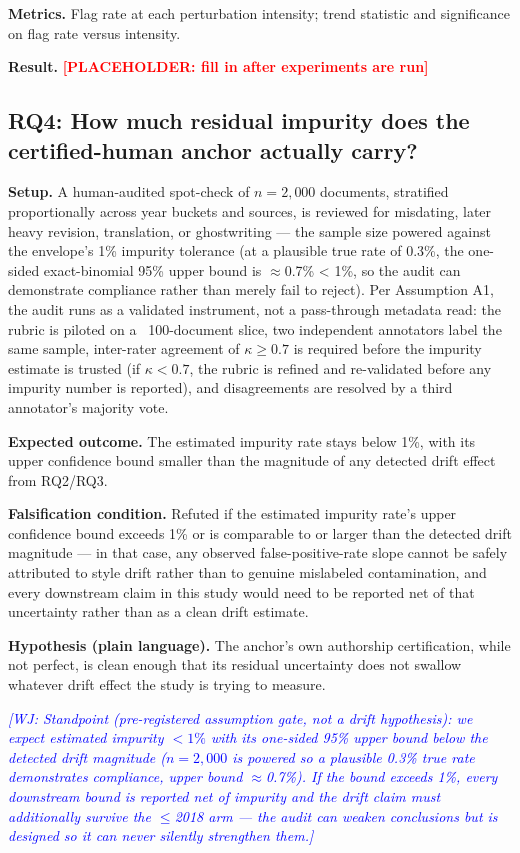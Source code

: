 \documentclass[conference]{IEEEtran}
\newcommand{\placeholder}[1]{\textcolor{red}{\textbf{[PLACEHOLDER: #1]}}}
\newcommand{\wj}[1]{\textcolor{blue}{\emph{[WJ: #1]}}}
\begin{document}
\textbf{Metrics.} Flag rate at each perturbation intensity; trend statistic and significance on flag rate versus intensity.

\textbf{Result.} \placeholder{fill in after experiments are run}

\subsection{RQ4: How much residual impurity does the certified-human anchor actually carry?}

 \textbf{Setup.} A human-audited spot-check of $n=2{,}000$ documents, stratified proportionally across year buckets and sources, is reviewed for misdating, later heavy revision, translation, or ghostwriting --- the sample size powered against the envelope's 1\% impurity tolerance (at a plausible true rate of 0.3\%, the one-sided exact-binomial 95\% upper bound is $\approx$0.7\% < 1\%, so the audit can demonstrate compliance rather than merely fail to reject). Per Assumption A1, the audit runs as a validated instrument, not a pass-through metadata read: the rubric is piloted on a ~100-document slice, two independent annotators label the same sample, inter-rater agreement of $\kappa \geq 0.7$ is required before the impurity estimate is trusted (if $\kappa < 0.7$, the rubric is refined and re-validated before any impurity number is reported), and disagreements are resolved by a third annotator's majority vote.

\textbf{Expected outcome.} The estimated impurity rate stays below 1\%, with its upper confidence bound smaller than the magnitude of any detected drift effect from RQ2/RQ3.

\textbf{Falsification condition.} Refuted if the estimated impurity rate's upper confidence bound exceeds 1\% or is comparable to or larger than the detected drift magnitude --- in that case, any observed false-positive-rate slope cannot be safely attributed to style drift rather than to genuine mislabeled contamination, and every downstream claim in this study would need to be reported net of that uncertainty rather than as a clean drift estimate.

\textbf{Hypothesis (plain language).} The anchor's own authorship certification, while not perfect, is clean enough that its residual uncertainty does not swallow whatever drift effect the study is trying to measure.

\wj{Standpoint (pre-registered assumption gate, not a drift hypothesis): we expect estimated impurity $<1\%$ with its one-sided 95\% upper bound below the detected drift magnitude ($n=2{,}000$ is powered so a plausible 0.3\% true rate demonstrates compliance, upper bound $\approx$0.7\%). If the bound exceeds 1\%, every downstream bound is reported net of impurity and the drift claim must additionally survive the $\leq$2018 arm --- the audit can weaken conclusions but is designed so it can never silently strengthen them.}
\end{document}
